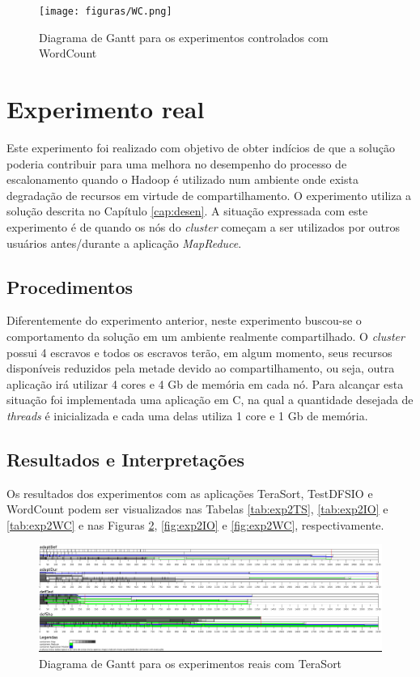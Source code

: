 \begin{figure}[!ht]
	\centering
	\texttt{[image: figuras/WC.png]}
	\caption{Diagrama de Gantt para os experimentos controlados com WordCount}
	\label{fig:exp1WC}
\end{figure}

\section{Experimento real}
\label{sec:expReal}
Este experimento foi realizado com objetivo de obter indícios de que a solução poderia contribuir para uma melhora no desempenho do processo de escalonamento quando o Hadoop é utilizado num ambiente onde exista degradação de recursos em virtude de compartilhamento. O experimento utiliza a solução descrita no Capítulo \ref{cap:desen}. A situação expressada com este experimento é de quando os nós do \textit{cluster} começam a ser utilizados por outros usuários antes/durante a aplicação \textit{MapReduce}.

\subsection{Procedimentos}
Diferentemente do experimento anterior, neste experimento buscou-se o comportamento da solução em um ambiente realmente compartilhado. O \textit{cluster} possui 4 escravos e todos os escravos terão, em algum momento, seus recursos disponíveis reduzidos pela metade devido ao compartilhamento, ou seja, outra aplicação irá utilizar 4 cores e 4 Gb de memória em cada nó. Para alcançar esta situação foi implementada uma aplicação em C, na qual a quantidade desejada de \textit{threads} é inicializada e cada uma delas utiliza 1 core e 1 Gb de memória.


\subsection{Resultados e Interpretações}
Os resultados dos experimentos com as aplicações TeraSort, TestDFSIO e WordCount podem ser visualizados nas Tabelas \ref{tab:exp2TS}, \ref{tab:exp2IO} e \ref{tab:exp2WC} e nas Figuras \ref{fig:exp2TS}, \ref{fig:exp2IO} e \ref{fig:exp2WC}, respectivamente.


\begin{figure}[!ht]
	\centering
	\includegraphics[width=1\textwidth]{figuras/TS-real.png}
	\caption{Diagrama de Gantt para os experimentos reais com TeraSort}
	\label{fig:exp2TS}
\end{figure}

